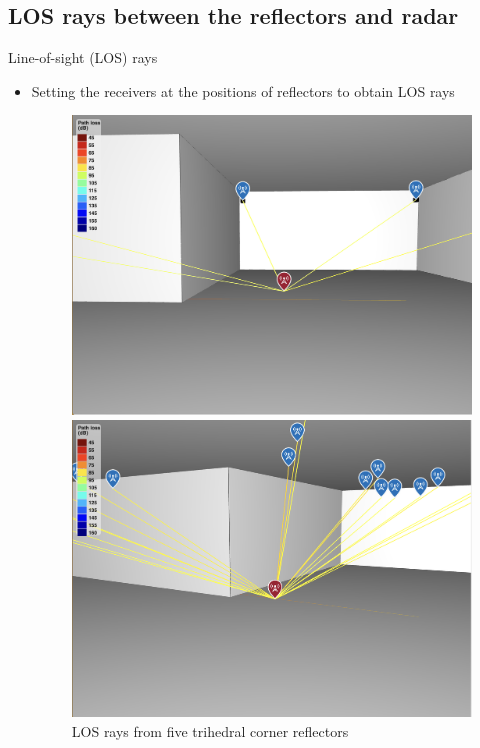 \documentclass{beamer}
\newcounter{section}
\begin{document}
\subsection{LOS rays between the reflectors and radar}
\begin{frame}[t]{Line-of-sight (LOS) rays}
    \begin{itemize}
	    \item Setting the receivers at the positions of reflectors to obtain LOS rays
        \vspace{0.5\baselineskip}
            \begin{figure}
                \centering
                \begin{minipage}{0.45\textwidth}
                    \centering
                    \includegraphics[height=0.7\textwidth]{figures/LOS_5_reflectors.png}
                    \caption{LOS rays from five trihedral corner reflectors}
                \end{minipage}
                \begin{minipage}{0.45\textwidth}
                    \centering
                    \includegraphics[height=0.7\textwidth]{figures/LOS_more_reflectors.png}

\end{minipage}
\end{figure}
\end{itemize}
\end{frame}
\end{document}
